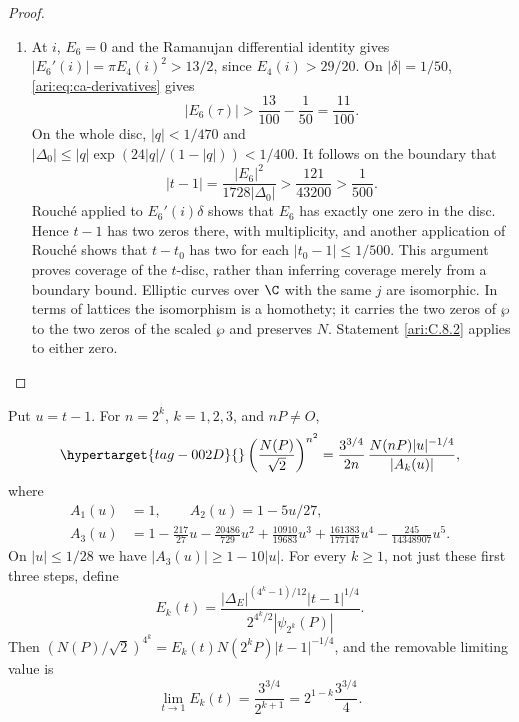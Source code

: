 \begin{proof}
\begin{enumerate}[label=\arabic*.,leftmargin=*]
\item At $i$, $E_6=0$ and the Ramanujan differential identity gives
$|E_6'(i)|=\pi E_4(i)^2>13/2$, since $E_4(i)>29/20$.
On $|\delta|=1/50$, \eqref{ari:eq:ca-derivatives} gives
\[
 |E_6(\tau)|>\frac{13}{100}-\frac1{50}=\frac{11}{100}.
\]
On the whole disc, $|q|<1/470$ and
$|\Delta_0|\le |q|\exp(24|q|/(1-|q|))<1/400$.
It follows on the boundary that
\[
 |t-1|=\frac{|E_6|^2}{1728|\Delta_0|}
 >\frac{121}{43200}>\frac1{500}.
\]
Rouch\'e applied to $E_6'(i)\delta$ shows that $E_6$ has
exactly one zero in the disc. Hence $t-1$ has two zeros there,
with multiplicity, and another application of Rouch\'e shows
that $t-t_0$ has two for each $|t_0-1|\le1/500$.
This argument proves coverage of the $t$-disc, rather than
inferring coverage merely from a boundary bound. Elliptic
curves over $\C$ with the same $j$ are isomorphic. In terms of
lattices the isomorphism is a homothety; it carries the two
zeros of $\wp$ to the two zeros of the scaled $\wp$ and
preserves $N$. Statement \ref{ari:C.8.2} applies to either zero.
\end{enumerate}
\end{proof}

\begin{proposition}\hypertarget{tag-001S}{}\label{ari:C.8.4}

Put $u=t-1$. For $n=2^k$, $k=1,2,3$, and $nP\ne O$,
\begin{equation}\hypertarget{tag-002D}{}\label{ari:eq:ca-ladder}
 \left(\frac{N(P)}{\sqrt2}\right)^{n^2}
 =\frac{3^{3/4}}{2n}\,
       \frac{N(nP)|u|^{-1/4}}{|A_k(u)|},
\end{equation}
where
\begin{align*}
 A_1(u)&=1,\qquad A_2(u)=1-5u/27,\\
 A_3(u)&=1-\frac{217}{27}u-\frac{20486}{729}u^2
       +\frac{10910}{19683}u^3
       +\frac{161383}{177147}u^4
       -\frac{245}{14348907}u^5.
\end{align*}
On $|u|\le1/28$ we have $|A_3(u)|\ge1-10|u|$.
For every $k\ge1$, not just these first three steps, define
\[
 E_k(t)=\frac{|\Delta_E|^{(4^k-1)/12}|t-1|^{1/4}}
 {2^{4^k/2}|\psi_{2^k}(P)|}.
\]
Then $(N(P)/\sqrt2)^{4^k}=E_k(t)N(2^kP)|t-1|^{-1/4}$,
and the removable limiting value is
\[
 \lim_{t\to1}E_k(t)=\frac{3^{3/4}}{2^{k+1}}
                 =2^{1-k}\frac{3^{3/4}}4.
\]
\end{proposition}


